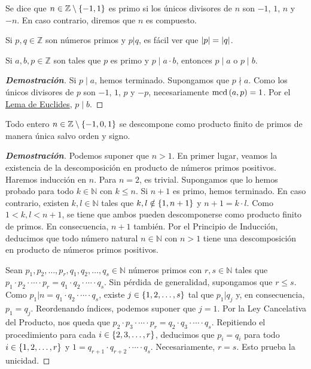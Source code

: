 \begin{definition}
  \rm Se dice que $n\in\mathbb{Z}\setminus\left\{-1,1\right\}$ es primo si los únicos divisores de $n$ son $-1$, $1$, $n$ y $-n$. En caso contrario, diremos que $n$ es compuesto.
\end{definition}

\begin{observation}
  \rm Si $p,q\in\mathbb{Z}$ son números primos y $p|q$, es fácil ver que $\left|p\right|=\left|q\right|$.
\end{observation}

\begin{proposition}
  \rm Si $a,b,p\in\mathbb{Z}$ son tales que $p$ es primo y $p\mid a\cdot b$, entonces $p\mid a$ o $p\mid b$.
  \begin{proof}[\rm\textbf{Demostración}]
    Si $p\mid a$, hemos terminado. Supongamos que $p\nmid a$. Como los únicos divisores de $p$ son $-1$, $1$, $p$ y $-p$, necesariamente $\text{mcd}\left(a,p\right)=1$. Por el \hyperref[Lema de Euclides]{Lema de Euclides}, $p\mid b$. %
  \end{proof}
\end{proposition}

\begin{theorem}\label{Teorema Fundamental de la Aritmética}
  \rm Todo entero $n\in\mathbb{Z}\setminus\left\{-1,0,1\right\}$ se descompone como producto finito de primos de manera única salvo orden y signo.
  \begin{proof}[\rm\textbf{Demostración}]
    Podemos suponer que $n>1$. En primer lugar, veamos la existencia de la descomposición en producto de números primos positivos. Haremos inducción en $n$. Para $n=2$, es trivial. Supongamos que lo hemos probado para todo $k\in\mathbb{N}$ con $k\leq n$. Si $n+1$ es primo, hemos terminado. En caso contrario, existen $k,l\in\mathbb{N}$ tales que $k,l\notin\left\{1,n+1\right\}$ y $n+1=k\cdot l$. Como $1<k,l<n+1$, se tiene que ambos pueden descomponerse como producto finito de primos. En consecuencia, $n+1$ también. Por el Principio de Inducción, deducimos que todo número natural $n\in\mathbb{N}$ con $n>1$ tiene una descomposición en producto de números primos positivos.

    Sean $p_1,p_2,\dots,p_r,q_1,q_2,\dots,q_s\in\mathbb{N}$ números primos con $r,s\in\mathbb{N}$ tales que $p_1\cdot p_2\cdot\cdots\cdot p_r=q_1\cdot q_2\cdot\cdots\cdot q_s$. Sin pérdida de generalidad, supongamos que $r\leq s$. Como $p_1|n=q_1\cdot q_2\cdot\cdots\cdot q_s$, existe $j\in\left\{1,2,\dots,s\right\}$ tal que $p_1|q_j$ y, en consecuencia, $p_1=q_j$. Reordenando índices, podemos suponer que $j=1$. Por la Ley Cancelativa del Producto, nos queda que $p_2\cdot p_3\cdot\cdots\cdot p_r=q_2\cdot q_3\cdot\cdots\cdot q_s$. Repitiendo el procedimiento para cada $i\in\left\{2,3,\dots,r\right\}$, deducimos que $p_i=q_i$ para todo $i\in\left\{1,2,\dots,r\right\}$ y $1=q_{r+1}\cdot q_{r+2}\cdot\cdots\cdot q_s$. Necesariamente, $r=s$. Esto prueba la unicidad.
  \end{proof}
\end{theorem}

